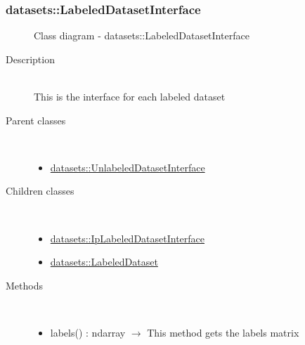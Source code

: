 \subsubsection[LabeledDatasetInterface]{datasets::LabeledDatasetInterface}
\begin{figure}[h]
\centering
{}
\caption{Class diagram - datasets::LabeledDatasetInterface}
\end{figure}\begin{description}
\item[Description] \hfill \\
 This is the interface for each labeled dataset
\item[Parent classes] \hfill \\
 \vspace{-1cm}
\begin{itemize}
\item \hyperlink{datasets::UnlabeledDatasetInterface}{datasets::UnlabeledDatasetInterface}
\end{itemize}

\item[Children classes] \hfill \\
 \vspace{-1cm}
\begin{itemize}
\item \hyperlink{datasets::IpLabeledDatasetInterface}{datasets::IpLabeledDatasetInterface}
\item \hyperlink{datasets::LabeledDataset}{datasets::LabeledDataset}
\end{itemize}

\item[Methods] \hfill \\
 \vspace{-1cm}
\begin{itemize}
\item labels() : ndarray $\rightarrow$ This method gets the labels matrix
\end{itemize}

\end{description}
\hypertarget{datasets::IpLabeledDatasetInterface}{}
